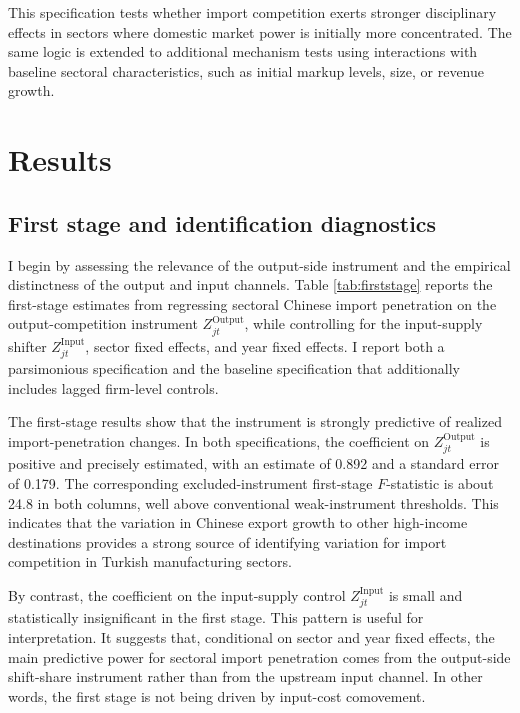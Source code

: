 \documentclass[12pt]{article}
\begin{document}
This specification tests whether import competition exerts stronger disciplinary effects in sectors where domestic market power is initially more concentrated. The same logic is extended to additional mechanism tests using interactions with baseline sectoral characteristics, such as initial markup levels, size, or revenue growth.

\section{Results}

\subsection{First stage and identification diagnostics}

I begin by assessing the relevance of the output-side instrument and the empirical distinctness of the output and input channels. Table \ref{tab:firststage} reports the first-stage estimates from regressing sectoral Chinese import penetration on the output-competition instrument \(Z^{\text{Output}}_{jt}\), while controlling for the input-supply shifter \(Z^{\text{Input}}_{jt}\), sector fixed effects, and year fixed effects. I report both a parsimonious specification and the baseline specification that additionally includes lagged firm-level controls.

The first-stage results show that the instrument is strongly predictive of realized import-penetration changes. In both specifications, the coefficient on \(Z^{\text{Output}}_{jt}\) is positive and precisely estimated, with an estimate of 0.892 and a standard error of 0.179. The corresponding excluded-instrument first-stage \(F\)-statistic is about 24.8 in both columns, well above conventional weak-instrument thresholds. This indicates that the variation in Chinese export growth to other high-income destinations provides a strong source of identifying variation for import competition in Turkish manufacturing sectors.

By contrast, the coefficient on the input-supply control \(Z^{\text{Input}}_{jt}\) is small and statistically insignificant in the first stage. This pattern is useful for interpretation. It suggests that, conditional on sector and year fixed effects, the main predictive power for sectoral import penetration comes from the output-side shift-share instrument rather than from the upstream input channel. In other words, the first stage is not being driven by input-cost comovement.
\end{document}
